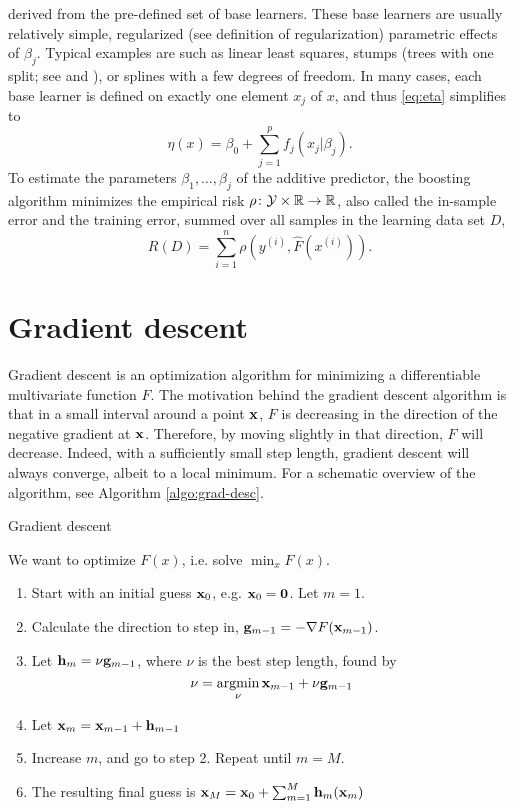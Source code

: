 derived from the pre-defined set of base learners.
These base learners are usually relatively simple, regularized (see definition of regularization) parametric effects of $\beta_j$. Typical examples are such as linear least squares, stumps (trees with one split; see \citet{buhlmann2007} and \citet{ESL}), or splines with a few degrees of freedom. In many cases, each base learner is defined on exactly one element $x_j$ of $x$, and thus \eqref{eq:eta} simplifies to
\begin{equation}\label{eq:eta-componentwise}
    \eta(x)=\beta_0+\sum_{j=1}^pf_j(x_j|\beta_j).
\end{equation}
To estimate the parameters $\beta_1,\ldots,\beta_j$ of the additive predictor, the boosting algorithm minimizes the empirical risk $\rho\colon\mathcal{Y}\times\mathbb{R}\to\mathbb{R}$, also called the in-sample error and the training error, summed over all samples in the learning data set $D$,
\begin{equation}\label{eq:empirical-risk}
    R(D)=\sum_{i=1}^n\rho(y^{(i)},\hat{F}(x^{(i)})).
\end{equation}

\section{Gradient descent}
Gradient descent is an optimization algorithm for minimizing a differentiable multivariate function $F$. The motivation behind the gradient descent algorithm is that in a small interval around a point $\mathbf{x}$, $F$ is decreasing in the direction of the negative gradient at $\mathbf{x}$. Therefore, by moving slightly in that direction, $F$ will decrease. Indeed, with a sufficiently small step length, gradient descent will always converge, albeit to a local minimum. For a schematic overview of the algorithm, see Algorithm \ref{algo:grad-desc}.
\begin{algorithm}
\caption{Gradient descent}
\label{algo:grad-desc}
We want to optimize $F(x)$, i.e. solve $\min_{x}F(x)$.
\begin{enumerate}
    \item Start with an initial guess $\mathbf{x}_0$, e.g. $\mathbf{x}_0=\mathbf{0}$. Let $m=1$.
    \item Calculate the direction to step in, $\mathbf{g}_{m-1}=-\nabla F(\mathbf{x}_{m-1})$.
    \item Let $\mathbf{h}_m=\nu \mathbf{g}_{m-1}$, where $\nu$ is the best step length, found by
        \begin{equation*}
            \nu=\operatorname*{argmin}_{\nu}\mathbf{x}_{m-1}+\nu \mathbf{g}_{m-1}
        \end{equation*}
    \item Let $\mathbf{x}_m=\mathbf{x}_{m-1}+\mathbf{h}_{m-1}$
    \item Increase $m$, and go to step 2. Repeat until $m=M$.
    \item The resulting final guess is $\mathbf{x}_M=\mathbf{x}_0+\sum_{m=1}^M\mathbf{h}_m(\mathbf{x}_m)$
\end{enumerate}
\end{algorithm}

